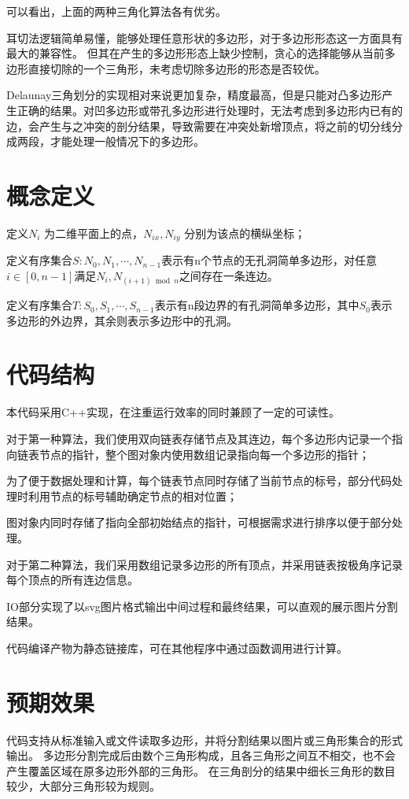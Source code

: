 可以看出，上面的两种三角化算法各有优劣。

耳切法逻辑简单易懂，能够处理任意形状的多边形，对于多边形形态这一方面具有最大的兼容性。
但其在产生的多边形形态上缺少控制，贪心的选择能够从当前多边形直接切除的一个三角形，未考虑切除多边形的形态是否较优。

Delaunay三角划分的实现相对来说更加复杂，精度最高，但是只能对凸多边形产生正确的结果。对凹多边形或带孔多边形进行处理时，无法考虑到多边形内已有的边，会产生与之冲突的剖分结果，导致需要在冲突处新增顶点，将之前的切分线分成两段，才能处理一般情况下的多边形。

\section{概念定义}

定义\(N_i\) 为二维平面上的点，\(N_{ix},N_{iy}\) 分别为该点的横纵坐标；

定义有序集合\(S:N_0,N_1,\cdots,N_{n-1}\)表示有n个节点的无孔洞简单多边形，对任意\(i\in [0,n-1] \)满足\(N_i,N_{(i+1) \bmod n}\)之间存在一条连边。

定义有序集合\(T:S_0,S_1,\cdots,S_{n-1}\)表示有n段边界的有孔洞简单多边形，其中\(S_0\)表示多边形的外边界，其余则表示多边形中的孔洞。

\section{代码结构}

本代码采用C++实现，在注重运行效率的同时兼顾了一定的可读性。

对于第一种算法，我们使用双向链表存储节点及其连边，每个多边形内记录一个指向链表节点的指针，整个图对象内使用数组记录指向每一个多边形的指针；

为了便于数据处理和计算，每个链表节点同时存储了当前节点的标号，部分代码处理时利用节点的标号辅助确定节点的相对位置；

图对象内同时存储了指向全部初始结点的指针，可根据需求进行排序以便于部分处理。

对于第二种算法，我们采用数组记录多边形的所有顶点，并采用链表按极角序记录每个顶点的所有连边信息。

IO部分实现了以svg图片格式输出中间过程和最终结果，可以直观的展示图片分割结果。

代码编译产物为静态链接库，可在其他程序中通过函数调用进行计算。

\section{预期效果}
代码支持从标准输入或文件读取多边形，并将分割结果以图片或三角形集合的形式输出。
多边形分割完成后由数个三角形构成，且各三角形之间互不相交，也不会产生覆盖区域在原多边形外部的三角形。
在三角剖分的结果中细长三角形的数目较少，大部分三角形较为规则。

